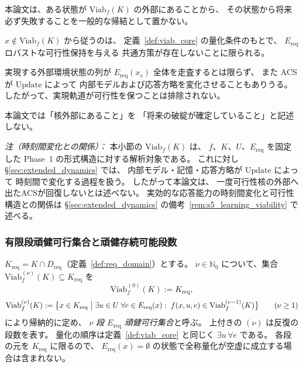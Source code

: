 \begin{remark}[可行性核外部性の意味の限定]
\label{rem:viab_core_exterior}
本論文は、ある状態が $\mathrm{Viab}_f(K)$ の外部にあることから、
その状態から将来必ず失敗することを一般的な帰結として置かない。

$x\notin\mathrm{Viab}_f(K)$ から従うのは、
定義~\ref{def:viab_core} の量化条件のもとで、
$E_{\mathrm{req}}$ ロバストな可行性保持を与える
共通方策が存在しないことに限られる。

実現する外部環境状態の列が
$E_{\mathrm{req}}(x_s)$ 全体を走査するとは限らず、
また ACS が $\mathrm{Update}$ によって
内部モデルおよび応答方略を変化させることもありうる。
したがって、実現軌道が可行性を保つことは排除されない。

本論文では「核外部にあること」を
「将来の破綻が確定していること」と記述しない。

\textit{注（時刻間変化との関係）：}
本小節の $\mathrm{Viab}_f(K)$ は、
$f$、$K$、$U$、$E_{\mathrm{req}}$ を固定した
Phase~1 の形式構造に対する解析対象である。
これに対し \S\ref{sec:extended_dynamics} では、
内部モデル・記憶・応答方略が $\mathrm{Update}$ によって
時刻間で変化する過程を扱う。
したがって本論文は、
一度可行性核の外部へ出たACSが回復しないとは述べない。
実効的な応答能力の時刻間変化と可行性構造との関係は
\S\ref{sec:extended_dynamics} の備考~\ref{rem:s5_learning_viability} で述べる。
\end{remark}

\subsubsection{有限段頑健可行集合と頑健存続可能段数}

\begin{definition}
\label{def:viab_stage}
$K_{\mathrm{req}}=K\cap D_{\mathrm{req}}$（定義~\ref{def:req_domain}）とする。
$\nu\in\mathbb{N}_0$ について、集合 $\mathrm{Viab}_f^{(\nu)}(K)\subseteq K_{\mathrm{req}}$ を
\[
  \mathrm{Viab}_f^{(0)}(K):=K_{\mathrm{req}},
\]
\[
  \mathrm{Viab}_f^{(\nu)}(K)
  :=
  \bigl\{
    x\in K_{\mathrm{req}}
    \bigm|
    \exists u\in U\;
    \forall e\in E_{\mathrm{req}}(x):\;
    f(x,u,e)\in\mathrm{Viab}_f^{(\nu-1)}(K)
  \bigr\}
  \qquad(\nu\ge1)
\]
により帰納的に定め、
\emph{$\nu$ 段 $E_{\mathrm{req}}$ 頑健可行集合}と呼ぶ。
上付きの $(\nu)$ は反復の段数を表す。
量化の順序は定義~\ref{def:viab_core} と同じく $\exists u\,\forall e$ である。
各段の元を $K_{\mathrm{req}}$ に限るので、
$E_{\mathrm{req}}(x)=\emptyset$ の状態で全称量化が空虚に成立する場合は含まれない。
\end{definition}

